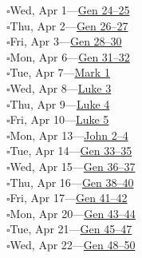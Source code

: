 \hypertarget{rp-2026-04-01}{}\noindent$\square$\enspace Wed, Apr 1\enspace---\enspace \hyperlink{ch-genesis-24}{Gen 24--25}\\
\hypertarget{rp-2026-04-02}{}\noindent$\square$\enspace Thu, Apr 2\enspace---\enspace \hyperlink{ch-genesis-26}{Gen 26--27}\\
\hypertarget{rp-2026-04-03}{}\noindent$\square$\enspace Fri, Apr 3\enspace---\enspace \hyperlink{ch-genesis-28}{Gen 28--30}\\
\hypertarget{rp-2026-04-06}{}\noindent$\square$\enspace Mon, Apr 6\enspace---\enspace \hyperlink{ch-genesis-31}{Gen 31--32}\\
\hypertarget{rp-2026-04-07}{}\noindent$\square$\enspace Tue, Apr 7\enspace---\enspace \hyperlink{ch-mark-1}{Mark 1}\\
\hypertarget{rp-2026-04-08}{}\noindent$\square$\enspace Wed, Apr 8\enspace---\enspace \hyperlink{ch-luke-3}{Luke 3}\\
\hypertarget{rp-2026-04-09}{}\noindent$\square$\enspace Thu, Apr 9\enspace---\enspace \hyperlink{ch-luke-4}{Luke 4}\\
\hypertarget{rp-2026-04-10}{}\noindent$\square$\enspace Fri, Apr 10\enspace---\enspace \hyperlink{ch-luke-5}{Luke 5}\\
\hypertarget{rp-2026-04-13}{}\noindent$\square$\enspace Mon, Apr 13\enspace---\enspace \hyperlink{ch-john-2}{John 2--4}\\
\hypertarget{rp-2026-04-14}{}\noindent$\square$\enspace Tue, Apr 14\enspace---\enspace \hyperlink{ch-genesis-33}{Gen 33--35}\\
\hypertarget{rp-2026-04-15}{}\noindent$\square$\enspace Wed, Apr 15\enspace---\enspace \hyperlink{ch-genesis-36}{Gen 36--37}\\
\hypertarget{rp-2026-04-16}{}\noindent$\square$\enspace Thu, Apr 16\enspace---\enspace \hyperlink{ch-genesis-38}{Gen 38--40}\\
\hypertarget{rp-2026-04-17}{}\noindent$\square$\enspace Fri, Apr 17\enspace---\enspace \hyperlink{ch-genesis-41}{Gen 41--42}\\
\hypertarget{rp-2026-04-20}{}\noindent$\square$\enspace Mon, Apr 20\enspace---\enspace \hyperlink{ch-genesis-43}{Gen 43--44}\\
\hypertarget{rp-2026-04-21}{}\noindent$\square$\enspace Tue, Apr 21\enspace---\enspace \hyperlink{ch-genesis-45}{Gen 45--47}\\
\hypertarget{rp-2026-04-22}{}\noindent$\square$\enspace Wed, Apr 22\enspace---\enspace \hyperlink{ch-genesis-48}{Gen 48--50}\\

